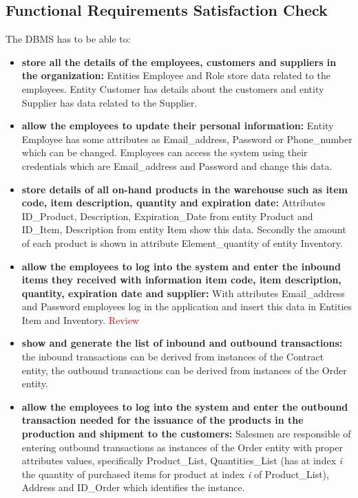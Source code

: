 \subsection{Functional Requirements Satisfaction Check}

The DBMS has to be able to:
\begin{itemize}
	\item \textbf{store all the details of the employees, customers and suppliers in the organization:} Entities Employee and Role store data related to the employees. Entity Customer has details about the customers and entity Supplier has data related to the Supplier.
	\item \textbf{allow the employees to update their personal information:} Entity Employee has some attributes as Email\_address, Password or Phone\_number which can be changed. Employees can access the system using their credentials which are Email\_address and Password and change this data.
	\item \textbf{store details of all on-hand products in the warehouse such as item code, item description, quantity and expiration date:} Attributes ID\_Product, Description, Expiration\_Date from entity Product and ID\_Item, Description from entity Item show this data. Secondly the amount of each product is shown in attribute Element\_quantity of entity Inventory.  
	\item \textbf{allow the employees to log into the system and enter the inbound items they received with information item code, item description, quantity, expiration date and supplier:} With attributes Email\_address and Password employees log in the application and insert this data in Entities Item and Inventory. \textcolor{Red}{Review}
	\item \textbf{show and generate the list of inbound and outbound transactions:} the inbound transactions can be derived from instances of the Contract entity, the outbound transactions can be derived from instances of the Order entity.
	\item \textbf{allow the employees to log into the system and enter the outbound transaction needed for the issuance of the products in the production and shipment to the customers:} Salesmen are responsible of entering outbound transactions as instances of the Order entity with proper attributes values, specifically Product\_List, Quantities\_List (has at index \textit{i} the quantity of purchased items for product at index \textit{i} of Product\_List), Address and ID\_Order which identifies the instance.

\end{itemize}
